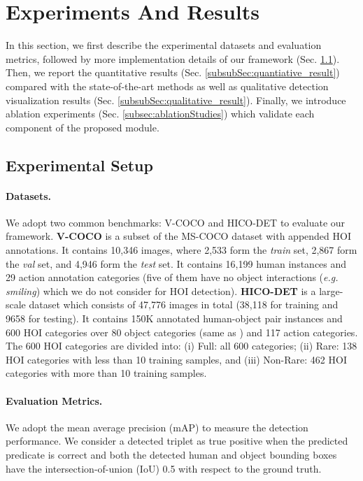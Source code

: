 \documentclass[10pt,twocolumn,letterpaper]{article}
\begin{document}
\section{Experiments And Results}\label{sec:exp_results}
In this section, we first describe the experimental datasets and evaluation metrics, followed by more implementation details of our framework (Sec. \ref{subsec:experimental_setup}). Then, we report the quantitative results (Sec. \ref{subsubSec:quantiative_result}) compared with the state-of-the-art methods as well as qualitative detection visualization results (Sec. \ref{subsubSec:qualitative_result}). Finally, we introduce ablation experiments (Sec. \ref{subsec:ablationStudies}) which validate each component of the proposed module.
\subsection{Experimental Setup}\label{subsec:experimental_setup}
\paragraph{\textbf{Datasets.}} 
We adopt two common benchmarks: V-COCO \cite{DBLP:GuptaM15} and HICO-DET \cite{chao2018learning} to evaluate our framework. \textbf{V-COCO} is a subset of the MS-COCO \cite{Lin2014MicrosoftContext} dataset with appended HOI annotations. It contains 10,346 images, where 2,533 form the \textit{train} set, 2,867 form the \textit{val} set, and 4,946 form the \textit{test} set. It contains 16,199 human instances and 29 action annotation categories (five of them have no object interactions (\textit{e.g. smiling}) which we do not consider for HOI detection). \textbf{HICO-DET} is a large-scale dataset which consists of 47,776 images in total (38,118 for training and 9658 for testing). It contains 150K annotated human-object pair instances and 600 HOI categories over 80 object categories (same as \cite{Lin2014MicrosoftContext}) and 117 action categories. The 600 HOI categories are divided into: (i) Full: all 600 categories; (ii) Rare: 138 HOI categories with less than 10 training samples, and (iii) Non-Rare: 462 HOI categories with more than 10 training samples. 
\paragraph{\textbf{Evaluation Metrics.}} 
We adopt the mean average precision (mAP) to measure the detection performance. We consider a detected triplet as true positive when the predicted predicate is correct and both the detected human and object bounding boxes have the intersection-of-union (IoU)  0.5 with respect to the ground truth. 
\end{document}
